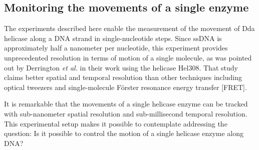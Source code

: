 \subsection{Monitoring the movements of a single enzyme}

The experiments described here enable the measurement of the movement of Dda helicase along a DNA strand in single-nucleotide steps.  Since ssDNA is approximately half a nanometer per nucleotide, this experiment provides unprecedented resolution in terms of motion of a single molecule, as was pointed out by Derrington \textit{et al.} \citep{Derrington2015} in their work using the helicase Hel308.  That study claims better spatial and temporal resolution than other techniques including optical tweezers and single-molecule F\"orster resonance energy transfer [FRET].

It is remarkable that the movements of a single helicase enzyme can be tracked with sub-nanometer spatial resolution and sub-millisecond temporal resolution.  This experimental setup makes it possible to contemplate addressing the question: Is it possible to control the motion of a single helicase enzyme along DNA?
